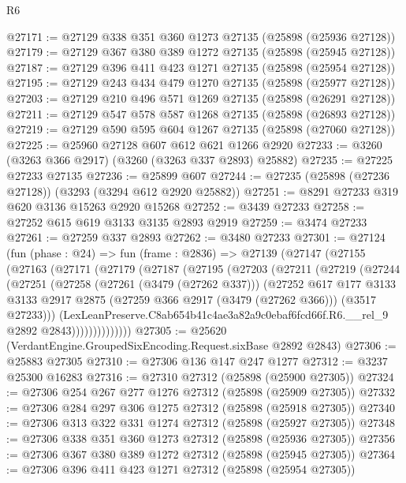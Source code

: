 \begin{lexlean}{R6}
\begin{coremodule}
@27171 := @27129 @338 @351 @360 @1273 @27135 (@25898 (@25936 @27128))
@27179 := @27129 @367 @380 @389 @1272 @27135 (@25898 (@25945 @27128))
@27187 := @27129 @396 @411 @423 @1271 @27135 (@25898 (@25954 @27128))
@27195 := @27129 @243 @434 @479 @1270 @27135 (@25898 (@25977 @27128))
@27203 := @27129 @210 @496 @571 @1269 @27135 (@25898 (@26291 @27128))
@27211 := @27129 @547 @578 @587 @1268 @27135 (@25898 (@26893 @27128))
@27219 := @27129 @590 @595 @604 @1267 @27135 (@25898 (@27060 @27128))
@27225 := @25960 @27128 @607 @612 @621 @1266 @2920
@27233 := @3260 (@3263 @366 @2917) (@3260 (@3263 @337 @2893) @25882)
@27235 := @27225 @27233 @27135
@27236 := @25899 @607
@27244 := @27235 (@25898 (@27236 @27128)) (@3293 (@3294 @612 @2920 @25882))
@27251 := @8291 @27233 @319 @620 @3136 @15263 @2920 @15268
@27252 := @3439 @27233
@27258 := @27252 @615 @619 @3133 @3135 @2893 @2919
@27259 := @3474 @27233
@27261 := @27259 @337 @2893
@27262 := @3480 @27233
@27301 := @27124
    (fun (phase : @24) =>
    fun (frame : @2836) =>
    @27139
      (@27147
        (@27155
          (@27163
            (@27171
              (@27179
                (@27187
                  (@27195
                    (@27203
                      (@27211
                        (@27219
                          (@27244
                            (@27251
                              (@27258
                                (@27261 (@3479 (@27262 @337)))
                                (@27252
                                  @617
                                  @177
                                  @3133
                                  @3133
                                  @2917
                                  @2875
                                  (@27259 @366 @2917 (@3479 (@27262 @366)))
                                  (@3517 @27233)))
                              (LexLeanPreserve.C8ab654b41c4ae3a82a9c0ebaf6fcd66f.R6.__rel_9
                                @2892
                                @2843))))))))))))))
@27305 := @25620 (VerdantEngine.GroupedSixEncoding.Request.sixBase @2892 @2843)
@27306 := @25883 @27305
@27310 := @27306 @136 @147 @247 @1277
@27312 := @3237 @25300 @16283
@27316 := @27310 @27312 (@25898 (@25900 @27305))
@27324 := @27306 @254 @267 @277 @1276 @27312 (@25898 (@25909 @27305))
@27332 := @27306 @284 @297 @306 @1275 @27312 (@25898 (@25918 @27305))
@27340 := @27306 @313 @322 @331 @1274 @27312 (@25898 (@25927 @27305))
@27348 := @27306 @338 @351 @360 @1273 @27312 (@25898 (@25936 @27305))
@27356 := @27306 @367 @380 @389 @1272 @27312 (@25898 (@25945 @27305))
@27364 := @27306 @396 @411 @423 @1271 @27312 (@25898 (@25954 @27305))

\end{coremodule}
\end{lexlean}
